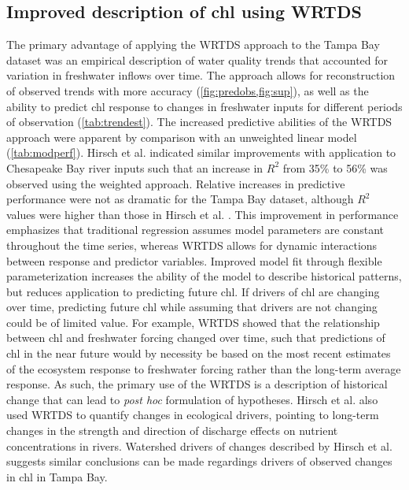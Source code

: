 \documentclass{svjour3}\usepackage[]{graphicx}\usepackage[]{color}
\begin{document}
\subsection{Improved description of \ac{chl} using \ac{WRTDS}}

The primary advantage of applying the \ac{WRTDS} approach to the Tampa Bay dataset was an empirical description of water quality trends that accounted for variation in freshwater inflows over time. The approach allows for reconstruction of observed trends  with more accuracy (\cref{fig:predobs,fig:sup}), as well as the ability to predict \ac{chl} response to changes in freshwater inputs for different periods of observation (\cref{tab:trendest}). The increased predictive abilities of the \ac{WRTDS} approach were apparent by comparison with an unweighted linear model (\cref{tab:modperf}).  Hirsch et al. \cite{Hirsch10} indicated similar improvements with application to Chesapeake Bay river inputs such that an increase in $R^2$ from 35\% to 56\% was observed using the weighted approach.  Relative increases in predictive performance were not as dramatic for the Tampa Bay dataset, although $R^2$ values were higher than those in Hirsch et al. \cite{Hirsch10}.  This improvement in performance emphasizes that traditional regression assumes model parameters are constant throughout the time series, whereas \ac{WRTDS} allows for dynamic interactions between response and predictor variables.  Improved model fit through flexible parameterization increases the ability of the model to describe historical patterns, but reduces application to predicting future \ac{chl}.  If drivers of \ac{chl} are changing over time, predicting future \ac{chl} while assuming that drivers are not changing could be of limited value.  For example, \ac{WRTDS} showed that the relationship between \ac{chl} and freshwater forcing changed over time, such that predictions of \ac{chl} in the near future would by necessity be based on the most recent estimates of the ecosystem response to freshwater forcing rather than the long-term average response.  As such, the primary use of the \ac{WRTDS} is a description of historical change that can lead to \textit{post hoc} formulation of hypotheses.  Hirsch et al. \cite{Hirsch10} also used WRTDS to quantify changes in ecological drivers, pointing to long-term changes in the strength and direction of discharge effects on nutrient concentrations in rivers.  Watershed drivers of changes described by Hirsch et al. \cite{Hirsch10} suggests similar conclusions can be made regardings drivers of observed changes in \ac{chl} in Tampa Bay.  
\end{document}
